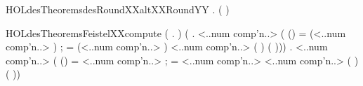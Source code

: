 \newcommand{\HOLdesTheoremsdesRoundXXaltXXRound}{\UseVerbatim{HOLdesTheoremsdesRoundXXaltXXRound}}
\begin{SaveVerbatim}{HOLdesTheoremsdesRoundXXaltXXRoundYY}
\HOLTokenTurnstile{} \HOLSymConst{\HOLTokenForall{}}  .  \HOLSymConst{\HOLTokenLt{}}  \HOLSymConst{\HOLTokenImp{}}      \HOLSymConst{=}  (   )
\end{SaveVerbatim}
\newcommand{\HOLdesTheoremsdesRoundXXaltXXRoundYY}{\UseVerbatim{HOLdesTheoremsdesRoundXXaltXXRoundYY}}
\begin{SaveVerbatim}{HOLdesTheoremsFeistelXXcompute}
\HOLTokenTurnstile{} (\HOLSymConst{\HOLTokenForall{}}   .       \HOLSymConst{=} ) \HOLSymConst{\HOLTokenConj{}}
   (\HOLSymConst{\HOLTokenForall{}}    .
        <..num comp'n..>    \HOLSymConst{=}
      (
         (\HOLSymConst{,}) =   (<..num comp'n..> \HOLSymConst{\ensuremath{-}} )   ;
          =  (<..num comp'n..> \HOLSymConst{\ensuremath{-}} ) 
          <..num comp'n..> \HOLSymConst{=}   ( \HOLSymConst{\HOLTokenEor{}}   \HOLSymConst{,})
          (\HOLSymConst{,} \HOLSymConst{\HOLTokenEor{}}   ))) \HOLSymConst{\HOLTokenConj{}}
   \HOLSymConst{\HOLTokenForall{}}    .
       <..num comp'n..>    \HOLSymConst{=}
     (
        (\HOLSymConst{,}) =   <..num comp'n..>   ;
         =  <..num comp'n..> 
         <..num comp'n..> \HOLSymConst{=}   ( \HOLSymConst{\HOLTokenEor{}}   \HOLSymConst{,})
         (\HOLSymConst{,} \HOLSymConst{\HOLTokenEor{}}   ))
\end{SaveVerbatim}
